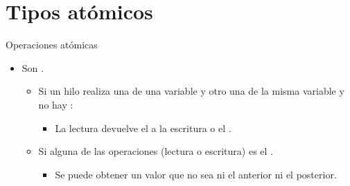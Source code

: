 \section{Tipos atómicos}

\begin{frame}[t]{Operaciones atómicas}
\begin{itemize}
\item Son .
    \begin{itemize}

      \item Si un hilo realiza una  de una variable y 
            otro una  de la misma variable y no hay 
            :
        \begin{itemize}
          \item La lectura devuelve el  a la escritura o el .
        \end{itemize}

      \item Si alguna de las operaciones (lectura o escritura) es  
            el .
        \begin{itemize}
          \item Se puede obtener un valor que no sea ni el anterior ni el posterior.
        \end{itemize}
    \end{itemize}
\end{itemize}
\end{frame}

